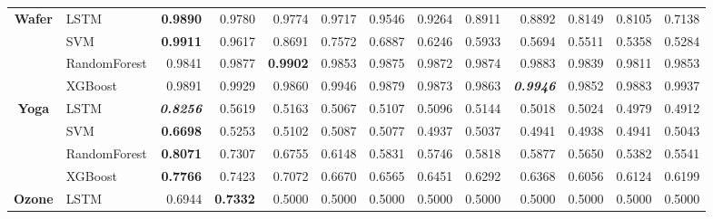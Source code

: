 \begin{table}[H]
\begin{adjustbox}{max width=14cm}
\begin{tabular}{|c|l|r|r|r|r|r|r|r|r|r|r|r|}
			\hline
			\textbf{Wafer}        & LSTM         & \textbf{0.9890}          & 0.9780                   & 0.9774          & 0.9717 & 0.9546          & 0.9264                   & 0.8911                   & 0.8892                   & 0.8149 & 0.8105                   & 0.7138          \\
			                      & SVM          & \textbf{0.9911}          & 0.9617                   & 0.8691          & 0.7572 & 0.6887          & 0.6246                   & 0.5933                   & 0.5694                   & 0.5511 & 0.5358                   & 0.5284          \\
			                      & RandomForest & 0.9841                   & 0.9877                   & \textbf{0.9902} & 0.9853 & 0.9875          & 0.9872                   & 0.9874                   & 0.9883                   & 0.9839 & 0.9811                   & 0.9853          \\
			                      & XGBoost      & 0.9891                   & 0.9929                   & 0.9860          & 0.9946 & 0.9879          & 0.9873                   & 0.9863                   & \textit{\textbf{0.9946}} & 0.9852 & 0.9883                   & 0.9937          \\
			\hline
			\textbf{Yoga}         & LSTM         & \textit{\textbf{0.8256}} & 0.5619                   & 0.5163          & 0.5067 & 0.5107          & 0.5096                   & 0.5144                   & 0.5018                   & 0.5024 & 0.4979                   & 0.4912          \\
			                      & SVM          & \textbf{0.6698}          & 0.5253                   & 0.5102          & 0.5087 & 0.5077          & 0.4937                   & 0.5037                   & 0.4941                   & 0.4938 & 0.4941                   & 0.5043          \\
			                      & RandomForest & \textbf{0.8071}          & 0.7307                   & 0.6755          & 0.6148 & 0.5831          & 0.5746                   & 0.5818                   & 0.5877                   & 0.5650 & 0.5382                   & 0.5541          \\
			                      & XGBoost      & \textbf{0.7766}          & 0.7423                   & 0.7072          & 0.6670 & 0.6565          & 0.6451                   & 0.6292                   & 0.6368                   & 0.6056 & 0.6124                   & 0.6199          \\
			\hline
			\textbf{Ozone}        & LSTM         & 0.6944                   & \textbf{0.7332}          & 0.5000          & 0.5000 & 0.5000          & 0.5000                   & 0.5000                   & 0.5000                   & 0.5000 & 0.5000                   & 0.5000          \\

\end{tabular}
\end{adjustbox}
\end{table}
